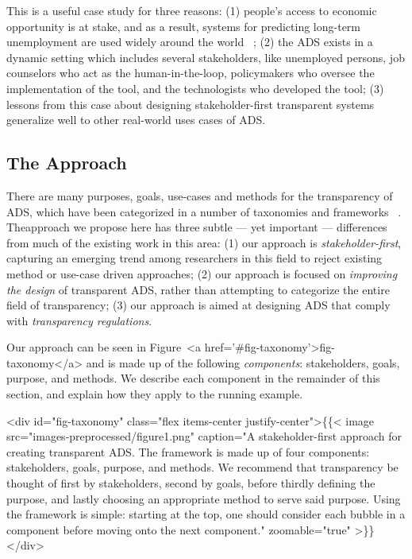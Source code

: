 \documentclass[sigconf, nonacm]{acmart}
\begin{document}
This is a useful case study for three reasons: (1) people's access to economic opportunity is at stake, and as a result, systems for predicting long-term unemployment are used widely around the world ~\cite{platform2018tackling, sztandar2018changing, loxha2014profiling, matty2013predicting, riipinen2011risk, caswell2010unemployed}; (2) the ADS exists in a dynamic setting which includes several stakeholders, like unemployed persons, job counselors who act as the human-in-the-loop, policymakers who oversee the implementation of the tool, and the technologists who developed the tool; (3) lessons from this case about designing stakeholder-first transparent systems generalize well to other real-world uses cases of ADS.

\subsection{The Approach}
\label{sec:approach}

There are many purposes, goals, use-cases and methods for the transparency of ADS, which have been categorized in a number of taxonomies and frameworks ~\cite{DBLP:journals/jmlr/AryaBCDHHHLLMMP20, ventocilla2018towards, DBLP:journals/corr/abs-2012-01805, molnar2019, meske, DBLP:conf/chi/LiaoGM20, rodolfa2020machine, richards2021human, DBLP:journals/corr/abs-2001-09734}. Theapproach we propose here has three subtle --- yet important --- differences from much of the existing work in this area: (1) our approach is \emph{stakeholder-first}, capturing an emerging trend among researchers in this field to reject existing method or use-case driven approaches; (2) our approach is focused on \emph{improving the design} of transparent ADS, rather than attempting to categorize the entire field of transparency; (3) our approach is aimed at designing ADS that comply with \emph{transparency regulations}.

Our approach can be seen in Figure~<a href='#fig-taxonomy'>fig-taxonomy</a> and is made up of the following \emph{components}: stakeholders, goals, purpose, and methods. We describe each component in the remainder of this section, and explain how they apply to the running example.

<div id="fig-taxonomy" class="flex items-center justify-center">\{\{< image src="images-preprocessed/figure1.png" caption="A stakeholder-first approach for creating transparent ADS. The framework is made up of four components: stakeholders, goals, purpose, and methods. We recommend that transparency be thought of first by stakeholders, second by goals, before thirdly defining the purpose, and lastly choosing an appropriate method to serve said purpose. Using the framework is simple: starting at the top, one should consider each bubble in a component before moving onto the next component." zoomable="true" >\}\}</div>
\end{document}
